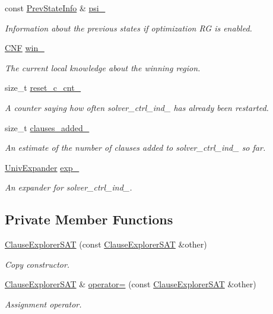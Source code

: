 \begin{DoxyCompactItemize}
const \hyperlink{classPrevStateInfo}{Prev\-State\-Info} \& \hyperlink{classClauseExplorerSAT_a5c9357bf710d59a91086dd0aa2419fe8}{psi\-\_\-}
\begin{DoxyCompactList}\small\item\em Information about the previous states if optimization R\-G is enabled. \end{DoxyCompactList}\item 
\hyperlink{classCNF}{C\-N\-F} \hyperlink{classClauseExplorerSAT_ac67574d6aba7936c410d4424d798efed}{win\-\_\-}
\begin{DoxyCompactList}\small\item\em The current local knowledge about the winning region. \end{DoxyCompactList}\item 
size\-\_\-t \hyperlink{classClauseExplorerSAT_a9fb3a26a305139346303b705c67dc7be}{reset\-\_\-c\-\_\-cnt\-\_\-}
\begin{DoxyCompactList}\small\item\em A counter saying how often solver\-\_\-ctrl\-\_\-ind\-\_\- has already been restarted. \end{DoxyCompactList}\item 
size\-\_\-t \hyperlink{classClauseExplorerSAT_a03fe2cc565e5c1bc0f5093fb01ca57ba}{clauses\-\_\-added\-\_\-}
\begin{DoxyCompactList}\small\item\em An estimate of the number of clauses added to solver\-\_\-ctrl\-\_\-ind\-\_\- so far. \end{DoxyCompactList}\item 
\hyperlink{classUnivExpander}{Univ\-Expander} \hyperlink{classClauseExplorerSAT_a0e5087acddea2f2a7da1c298a93c40fa}{exp\-\_\-}
\begin{DoxyCompactList}\small\item\em An expander for solver\-\_\-ctrl\-\_\-ind\-\_\-. \end{DoxyCompactList}\end{DoxyCompactItemize}
\subsection*{Private Member Functions}
\begin{DoxyCompactItemize}
\item 
\hyperlink{classClauseExplorerSAT_ad7a7e6be6d2450e716b2132308bdeeea}{Clause\-Explorer\-S\-A\-T} (const \hyperlink{classClauseExplorerSAT}{Clause\-Explorer\-S\-A\-T} \&other)
\begin{DoxyCompactList}\small\item\em Copy constructor. \end{DoxyCompactList}\item 
\hyperlink{classClauseExplorerSAT}{Clause\-Explorer\-S\-A\-T} \& \hyperlink{classClauseExplorerSAT_a1b2f9a77392cebd3e648d1696685e9b4}{operator=} (const \hyperlink{classClauseExplorerSAT}{Clause\-Explorer\-S\-A\-T} \&other)
\begin{DoxyCompactList}\small\item\em Assignment operator. \end{DoxyCompactList}\end{DoxyCompactItemize}


